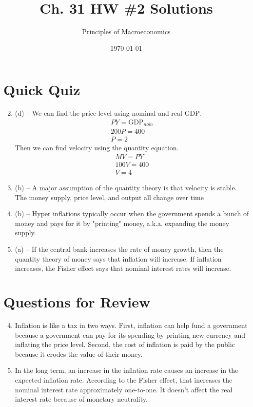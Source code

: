 \documentclass{article}
\title{Ch. 31 HW \#2 Solutions}
\author{Principles of Macroeconomics}
\date{\today}
\begin{document}
\maketitle

\section*{Quick Quiz}

\begin{enumerate}

\setcounter{enumi}{1}
\item (d) -- We can find the price level using nominal and real GDP.
	\begin{gather*}
	PY = \text{GDP}_{nom} \\
	200P = 400 \\
	P = 2
	\end{gather*}
	Then we can find velocity using the quantity equation.
	\begin{gather*}
	MV = PY \\
	100V = 400 \\
	V = 4
	\end{gather*}

\item (b) -- A major assumption of the quantity theory is that velocity is stable. The money supply, price level, and output all change over time

\item (b) -- Hyper inflations typically occur when the government spends a bunch of money and pays for it by "printing" money, a.k.a. expanding the money supply.

\item (a) -- If the central bank increases the rate of money growth, then the quantity theory of money says that inflation will increase. If inflation increases, the Fisher effect says that nominal interest rates will increase.

\end{enumerate}

\section*{Questions for Review}

\begin{enumerate}

\setcounter{enumi}{3}
\item Inflation is like a tax in two ways. First, inflation can help fund a government because a government can pay for its spending by printing new currency and inflating the price level. Second, the cost of inflation is paid by the public because it erodes the value of their money. 

\item In the long term, an increase in the inflation rate causes an increase in the expected inflation rate. According to the Fisher effect, that increases the nominal interest rate approximately one-to-one. It doesn't affect the real interest rate because of monetary neutrality.

\end{enumerate}
\end{document}
